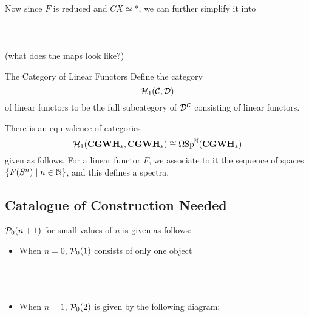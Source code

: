 \documentclass[a4paper]{article}
\begin{document}
Now since $F$ is reduced and $CX\simeq\ast$, we can further simplify it into \\~\\
\\~\\ 
(what does the maps look like?)





\begin{defn}{The Category of Linear Functors}{} Define the category $$\mathcal{H}_1(\mathcal{C},\mathcal{D})$$ of linear functors to be the full subcategory of $\mathcal{D}^{\mathcal{C}}$ consisting of linear functors. 
\end{defn}

\begin{thm}{}{} There is an equivalence of categories $$\mathcal{H}_1(\bold{CGWH}_\ast,\bold{CGWH}_\ast)\cong\Omega\text{Sp}^{\mathbb{N}}(\bold{CGWH}_\ast)$$ given as follows. For a linear functor $F$, we associate to it the sequence of spaces $\{F(S^n)\;|\;n\in\mathbb{N}\}$, and this defines a spectra. 
\end{thm}

\subsection{Catalogue of Construction Needed}
\begin{eg}{}{} $\mathcal{P}_0(n+1)$ for small values of $n$ is given as follows: 
\begin{itemize}
\item When $n=0$, $\mathcal{P}_0(1)$ consists of only one object \\~\\
\\~\\ 
\item When $n=1$, $\mathcal{P}_0(2)$ is given by the following diagram: \\~\\
\\~\\
\end{itemize}
\end{eg}
\end{document}
